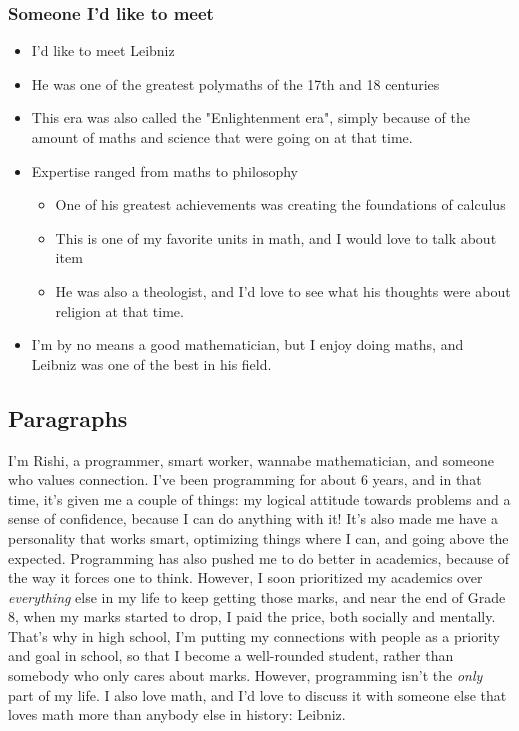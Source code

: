 \documentclass[]{article}
\begin{document}
\subsubsection*{Someone I'd like to meet}
\begin{itemize}
    \item I'd like to meet Leibniz
    \item He was one of the greatest polymaths of the 17th and 18 centuries
    \item This era was also called the "Enlightenment era", simply because of the amount of maths and science that were going on at that time.
    \item Expertise ranged from maths to philosophy
    \begin{itemize}
        \item One of his greatest achievements was creating the foundations of calculus
        \item This is one of my favorite units in math, and I would love to talk about item
        \item He was also a theologist, and I'd love to see what his thoughts were about religion at that time.
    \end{itemize}
    \item I'm by no means a good mathematician, but I enjoy doing maths, and Leibniz was one of the best in his field.
\end{itemize}

\newpage

\subsection*{Paragraphs}

I'm Rishi, a programmer, smart worker, wannabe mathematician, and someone who values connection. I've been programming for about 6 years, and in that time, it's given me a couple of things: my logical attitude towards problems and a sense of confidence, because I can do anything with it! It's also made me have a personality that works smart, optimizing things where I can, and going above the expected. Programming has also pushed me to do better in academics, because of the way it forces one to think. However, I soon prioritized my academics over \textit{everything} else in my life to keep getting those marks, and near the end of Grade 8, when my marks started to drop, I paid the price, both socially and mentally. That's why in high school, I'm putting my connections with people as a priority and goal in school, so that I become a well-rounded student, rather than somebody who only cares about marks. However, programming isn't the \textit{only} part of my life. I also love math, and I'd love to discuss it with someone else that loves math more than anybody else in history: Leibniz.
\newline
\end{document}

